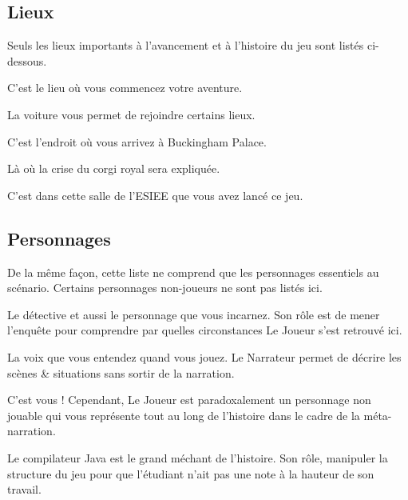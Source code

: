 \subsection{Lieux}

Seuls les lieux importants à l'avancement et à l'histoire du jeu sont listés ci-dessous.

\begin{description}[leftmargin=!,labelwidth=\widthof{\bfseries Bureau de Murphy}]
  \item [Bureau de Murphy] C'est le lieu où vous commencez votre aventure.
  \item [Voiture] La voiture vous permet de rejoindre certains lieux.
  \item [Grand escalier] C'est l'endroit où vous arrivez à Buckingham Palace.
  \item [Salle de réception] Là où la crise du corgi royal sera expliquée.
  \item [Salle de l'ESIEE] C'est dans cette salle de l'ESIEE que vous avez lancé ce jeu.
\end{description}

\subsection{Personnages}

De la même façon, cette liste ne comprend que les personnages essentiels au scénario. Certains personnages non-joueurs ne sont pas listés ici.

\begin{description}[leftmargin=!,labelwidth=\widthof{\bfseries Le Compilateur}]
  \item [Murphy Law] Le détective et aussi le personnage que vous incarnez. Son rôle est de mener l'enquête pour comprendre par quelles circonstances Le Joueur s'est retrouvé ici.
  \item [Le Narrateur] La voix que vous entendez quand vous jouez. Le Narrateur permet de décrire les scènes \& situations sans sortir de la narration. 
  \item [Le Joueur] C'est vous ! Cependant, Le Joueur est paradoxalement un personnage non jouable qui vous représente tout au long de  l'histoire dans le cadre de la méta-narration.
  \item [Le Compilateur] Le compilateur Java est le grand méchant de l'histoire. Son rôle, manipuler la structure du jeu pour que l'étudiant n'ait pas une note à la hauteur de son travail.
\end{description}

